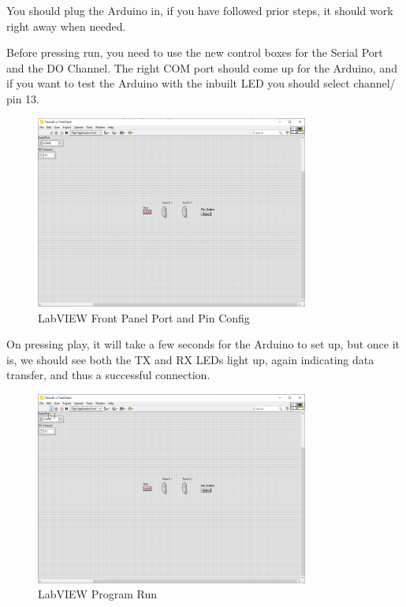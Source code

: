 \documentclass[a4paper,11pt]{report}
\begin{document}
You should plug the Arduino in, if you have followed prior steps, it should work right away when needed.

Before pressing run, you need to use the new control boxes for the Serial Port and the DO Channel. The right COM port should come up for the Arduino, and if you want to test the Arduino with the inbuilt LED you should select channel/ pin 13.

\begin{figure}[H]
\centering
\includegraphics[width=0.8\textwidth]{screenshots/labview29}
\caption{LabVIEW Front Panel Port and Pin Config}
\end{figure}

On pressing play, it will take a few seconds for the Arduino to set up, but once it is, we should see both the TX and RX LEDs light up, again indicating data transfer, and thus a successful connection.

\begin{figure}[H]
\centering
\includegraphics[width=0.8\textwidth]{screenshots/labview30}
\caption{LabVIEW Program Run}
\end{figure}
\end{document}
